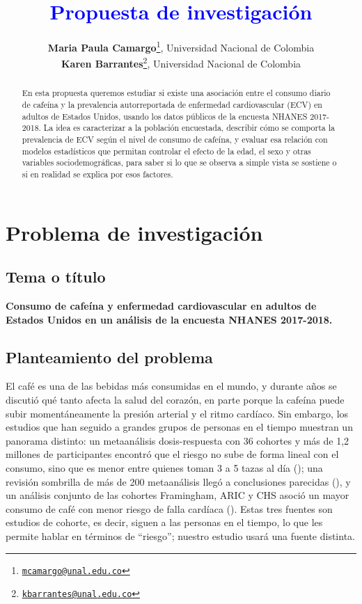 \documentclass[
  spanish,
  12pt,
]{article}
\title{\textcolor{blue}{Propuesta de investigación }}
\author{\textbf{Maria Paula Camargo}\footnote{\href{mailto:mcamargo@unal.edu.co}{\nolinkurl{mcamargo@unal.edu.co}}}, Universidad Nacional de Colombia\\
\textbf{Karen Barrantes}\footnote{\href{mailto:kbarrantes@unal.edu.co}{\nolinkurl{kbarrantes@unal.edu.co}}}, Universidad Nacional de Colombia}
\date{}
\begin{document}
\maketitle
\begin{abstract}
En esta propuesta queremos estudiar si existe una asociación entre el
consumo diario de cafeína y la prevalencia autorreportada de enfermedad
cardiovascular (ECV) en adultos de Estados Unidos, usando los datos
públicos de la encuesta NHANES 2017-2018. La idea es caracterizar a la
población encuestada, describir cómo se comporta la prevalencia de ECV
según el nivel de consumo de cafeína, y evaluar esa relación con modelos
estadísticos que permitan controlar el efecto de la edad, el sexo y otras
variables sociodemográficas, para saber si lo que se observa a simple
vista se sostiene o si en realidad se explica por esos factores.
\end{abstract}

{
\setcounter{tocdepth}{3}
\tableofcontents
}
\section{Problema de investigación}\label{problema-de-investigaciuxf3n}

\subsection{Tema o título}\label{tema-o-tuxedtulo}

\textbf{Consumo de cafeína y enfermedad cardiovascular en adultos de Estados
Unidos en un análisis de la encuesta NHANES 2017-2018.}

\subsection{Planteamiento del problema}\label{planteamiento-del-problema}

El café es una de las bebidas más consumidas en el mundo, y durante
años se discutió qué tanto afecta la salud del corazón, en parte
porque la cafeína puede subir momentáneamente la presión arterial y el
ritmo cardíaco. Sin embargo, los estudios que han seguido a grandes
grupos de personas en el tiempo muestran un panorama distinto: un
metaanálisis dosis-respuesta con 36 cohortes y más de 1,2 millones de
participantes encontró que el riesgo no sube de forma lineal con el
consumo, sino que es menor entre quienes toman 3 a 5 tazas al día
(); una revisión sombrilla de más de 200 metaanálisis
llegó a conclusiones parecidas (), y un análisis
conjunto de las cohortes Framingham, ARIC y CHS asoció un mayor
consumo de café con menor riesgo de falla cardíaca ().
Estas tres fuentes son estudios de cohorte, es decir, siguen a las
personas en el tiempo, lo que les permite hablar en términos de
``riesgo''; nuestro estudio usará una fuente distinta.
\end{document}
